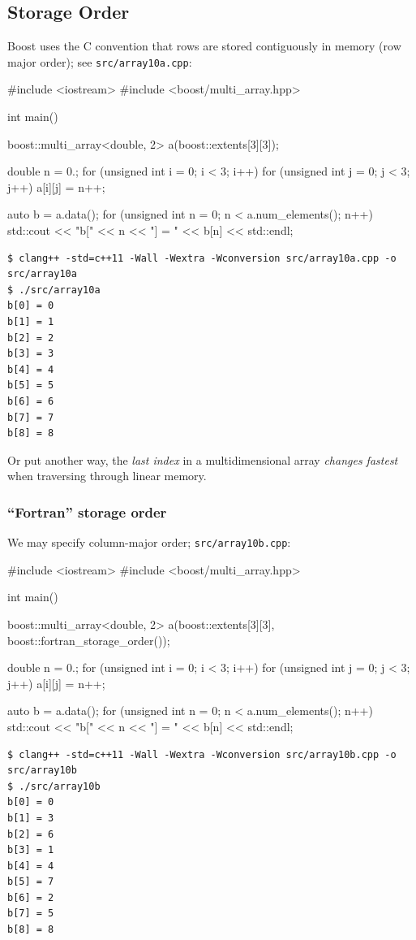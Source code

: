 \documentclass[12pt,letterpaper,twoside]{article}
\begin{document}
\subsection{Storage Order}
Boost uses the C convention that rows are stored contiguously in memory (row
major order); see
\texttt{src/array10a.cpp}:

\begin{cpp}
#include <iostream>
#include <boost/multi_array.hpp>

int main() {
  boost::multi_array<double, 2> a(boost::extents[3][3]);

  double n = 0.;
  for (unsigned int i = 0; i < 3; i++)
    for (unsigned int j = 0; j < 3; j++)
      a[i][j] = n++;

  auto b = a.data();
  for (unsigned int n = 0; n < a.num_elements(); n++)
    std::cout << "b[" << n << "] = " << b[n] << std::endl;
}
\end{cpp}

{\small
\begin{verbatim}
$ clang++ -std=c++11 -Wall -Wextra -Wconversion src/array10a.cpp -o src/array10a
$ ./src/array10a
b[0] = 0
b[1] = 1
b[2] = 2
b[3] = 3
b[4] = 4
b[5] = 5
b[6] = 6
b[7] = 7
b[8] = 8
\end{verbatim}
}
Or put another way, the \emph{last index} in a multidimensional array \emph{changes
fastest} when traversing through linear memory.

\subsubsection{``Fortran'' storage order} We may specify column-major order;
\texttt{src/array10b.cpp}:

\begin{cpp}
#include <iostream>
#include <boost/multi_array.hpp>

int main() {
  boost::multi_array<double, 2> a(boost::extents[3][3],
                                  boost::fortran_storage_order());

  double n = 0.;
  for (unsigned int i = 0; i < 3; i++)
    for (unsigned int j = 0; j < 3; j++)
      a[i][j] = n++;

  auto b = a.data();
  for (unsigned int n = 0; n < a.num_elements(); n++)
    std::cout << "b[" << n << "] = " << b[n] << std::endl;
}
\end{cpp}

{\small
\begin{verbatim}
$ clang++ -std=c++11 -Wall -Wextra -Wconversion src/array10b.cpp -o src/array10b
$ ./src/array10b
b[0] = 0
b[1] = 3
b[2] = 6
b[3] = 1
b[4] = 4
b[5] = 7
b[6] = 2
b[7] = 5
b[8] = 8
\end{verbatim}
}
\end{document}
